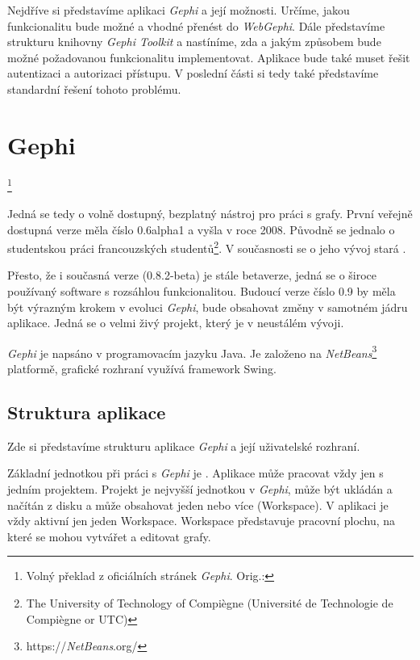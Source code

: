 \documentclass[thesis=M,czech]{FITthesis}[2014/05/6]
\begin{document}
Nejdříve si představíme aplikaci \textit{Gephi} a její možnosti. Určíme, jakou funkcionalitu bude možné a vhodné přenést do \textit{WebGephi}. Dále představíme strukturu knihovny \textit{Gephi Toolkit}
a nastíníme, zda a jakým způsobem bude možné požadovanou funkcionalitu implementovat. Aplikace bude také muset řešit autentizaci a autorizaci přístupu. V poslední části si tedy také představíme
standardní řešení tohoto problému.

\section{Gephi}
\textit{}\footnote{Volný překlad z oficiálních stránek \textit{Gephi}\cite{gephi}. Orig.: }

Jedná se tedy o volně dostupný, bezplatný nástroj pro práci s grafy. První veřejně dostupná verze měla číslo 0.6alpha1 a vyšla v roce 2008.
Původně se jednalo o studentskou práci francouzských studentů\footnote{The
University of Technology of Compiègne (Université de Technologie de Compiègne or
UTC)}. V současnosti se o jeho vývoj stará \cite{gephi:consortium}.

Přesto, že i současná verze (0.8.2-beta) je stále betaverze, jedná se o široce
používaný software s rozsáhlou funkcionalitou. Budoucí verze číslo 0.9 by měla být výrazným krokem v evoluci \textit{Gephi}, bude obsahovat změny v samotném jádru aplikace.
Jedná se o velmi živý projekt, který je v neustálém vývoji.

\textit{Gephi} je napsáno v programovacím jazyku Java. Je založeno na \textit{NetBeans}\footnote{https://\textit{NetBeans}.org/} platformě, grafické rozhraní využívá framework Swing.  

\subsection{Struktura aplikace}
Zde si představíme strukturu aplikace \textit{Gephi} a její uživatelské rozhraní.

Základní jednotkou při práci s \textit{Gephi} je . Aplikace může pracovat vždy jen s jedním projektem. Projekt je nejvyšší jednotkou v \textit{Gephi}, může být ukládán a 
načítán z disku a může obsahovat jeden nebo více  (Workspace). V aplikaci je vždy aktivní jen jeden Workspace. Workspace představuje 
pracovní plochu, na které se mohou vytvářet a editovat grafy.
 
\end{document}
